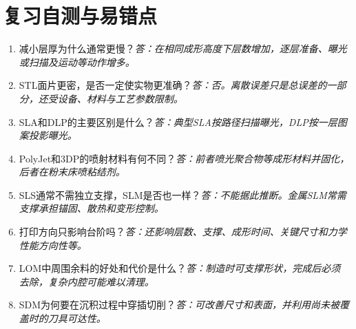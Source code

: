 \section{复习自测与易错点}
\begin{enumerate}
\item 减小层厚为什么通常更慢？\textit{答：在相同成形高度下层数增加，逐层准备、曝光或扫描及运动等动作增多。}
\item STL面片更密，是否一定使实物更准确？\textit{答：否。离散误差只是总误差的一部分，还受设备、材料与工艺参数限制。}
\item SLA和DLP的主要区别是什么？\textit{答：典型SLA按路径扫描曝光，DLP按一层图案投影曝光。}
\item PolyJet和3DP的喷射材料有何不同？\textit{答：前者喷光聚合物等成形材料并固化，后者在粉末床喷粘结剂。}
\item SLS通常不需独立支撑，SLM是否也一样？\textit{答：不能据此推断。金属SLM常需支撑承担锚固、散热和变形控制。}
\item 打印方向只影响台阶吗？\textit{答：还影响层数、支撑、成形时间、关键尺寸和力学性能方向性等。}
\item LOM中周围余料的好处和代价是什么？\textit{答：制造时可支撑形状，完成后必须去除，复杂内腔可能难以清理。}
\item SDM为何要在沉积过程中穿插切削？\textit{答：可改善尺寸和表面，并利用尚未被覆盖时的刀具可达性。}
\end{enumerate}
